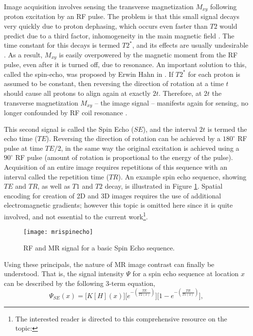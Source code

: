 Image acquisition involves sensing the transverse magnetization $M_{xy}$ following proton excitation by an RF pulse. The problem is that this small signal decays very quickly due to proton dephasing, which occurs even faster than $T2$ would predict due to a third factor, inhomogeneity in the main magnetic field \cite{Chavhan2009}. The time constant for this decays is termed $T2^*$, and its effects are usually undesirable \cite{Chavhan2009}. As a result, $M_{xy}$ is easily overpowered by the magnetic moment from the RF pulse, even after it is turned off, due to resonance. An important solution to this, called the spin-echo, was proposed by Erwin Hahn in \citeyear{Hahn1950} \cite{Hahn1950}. If $T2^*$ for each proton is assumed to be constant, then reversing the direction of rotation at a time $t$ should cause all protons to align again at exactly $2t$. Therefore, at $2t$ the transverse magnetization $M_{xy}$ -- the image signal -- manifests again for sensing, no longer confounded by RF coil resonance \cite{Hahn1950}.
\par
This second signal is called the Spin Echo ($SE$), and the interval $2t$ is termed the echo time ($TE$). Reversing the direction of rotation can be achieved by a $180^{\circ}$ RF pulse at time $TE/2$, in the same way the original excitation is achieved using a $90^{\circ}$ RF pulse (amount of rotation is proportional to the energy of the pulse). Acquisition of an entire image requires repetitions of this sequence with an interval called the repetition time ($TR$). An example spin echo sequence, showing $TE$ and $TR$, as well as $T1$ and $T2$ decay, is illustrated in Figure \ref{fig:mrispinecho}. Spatial encoding for creation of 2D and 3D images requires the use of additional electromagnetic gradients; however this topic is omitted here since it is quite involved, and not essential to the current work\footnote{The interested reader is directed to this comprehensive resource on the topic: }.
\par
\begin{figure}
  \centering\texttt{[image: mrispinecho]}
  \caption{RF and MR signal for a basic Spin Echo sequence.}
  \label{fig:mrispinecho}
\end{figure}
Using these principals, the nature of MR image contrast can finally be understood. That is, the signal intensity $\Psi$ for a spin echo sequence at location $x$ can be described by the following 3-term equation,
\begin{equation}\label{eq:MRI-SE}
\Psi_{SE}(x) = \bigg[K [H](x)\bigg]\bigg[e^{-\left(\frac{TE}{T2(x)}\right)}\bigg]\bigg[1 - e^{-\left(\frac{TR}{T1(x)}\right)}\bigg],
\end{equation}
